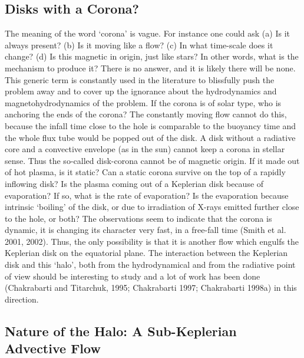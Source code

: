 \documentclass{ws-procs975x65}
\begin{document}
\subsection{Disks with a Corona?}

The meaning of the word `corona' is vague. For instance one could ask (a) Is it always present? (b) Is it
moving like a flow? (c) In what time-scale does it change? (d) Is this magnetic in origin, just like stars?
In other words, what is the mechanism to produce it? There is no answer, and it is likely there will be none.
This generic term is constantly used in the literature to blissfully push the problem away and to 
cover up the ignorance about the hydrodynamics and magnetohydrodynamics of
the problem. If the corona is of solar type, who is anchoring 
the ends of the corona? The constantly moving flow cannot do this, because the infall time close to the
hole is comparable to the buoyancy time and the whole flux tube would be popped out of the disk.
A disk without a radiative core and a convective envelope (as in the sun) cannot keep a corona in stellar
sense. Thus the so-called disk-corona cannot be of magnetic origin. 
If it made out of hot plasma, is it static? Can a static corona survive on the top of a rapidly 
inflowing disk? Is the plasma coming out of a Keplerian disk because of evaporation? 
If so, what is the rate of evaporation? Is the evaporation because intrinsic 
`boiling' of the disk, or due to irradiation of X-rays emitted further close to the hole, or both?
The observations seem to indicate that the corona is dynamic, it is changing its character 
very fast, in a free-fall time (Smith et al. 2001, 2002). Thus, the only possibility is that 
it is another flow which engulfs the Keplerian disk on the equatorial plane. The interaction
between the Keplerian disk and this `halo', both from the hydrodynamical and from the radiative point of view
should be interesting to study and a lot of work has been done (Chakrabarti and Titarchuk, 1995;
Chakrabarti 1997; Chakrabarti 1998a) in this direction. 

\subsection{Nature of the Halo: A Sub-Keplerian Advective Flow}
\end{document}
